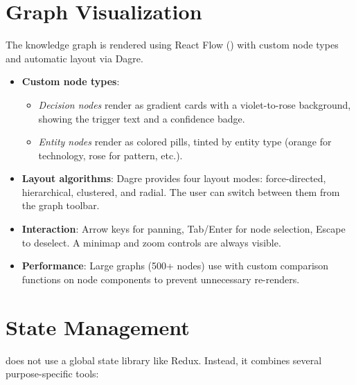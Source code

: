 \section{Graph Visualization}
\label{sec:graph-visualization}

The knowledge graph is rendered using React Flow ()
with custom node types and automatic layout via Dagre.

\begin{itemize}
    \item \textbf{Custom node types}:
          \begin{itemize}
              \item \emph{Decision nodes} render as gradient cards with a
                    violet-to-rose background, showing the trigger text and
                    a confidence badge.
              \item \emph{Entity nodes} render as colored pills, tinted
                    by entity type (orange for technology, rose for pattern,
                    etc.).
          \end{itemize}

    \item \textbf{Layout algorithms}: Dagre provides four layout modes:
          force-directed, hierarchical, clustered, and radial.  The user
          can switch between them from the graph toolbar.

    \item \textbf{Interaction}: Arrow keys for panning, Tab/Enter for
          node selection, Escape to deselect.  A minimap and zoom
          controls are always visible.

    \item \textbf{Performance}: Large graphs (500+ nodes) use
           with custom comparison functions on node
          components to prevent unnecessary re-renders.
\end{itemize}


\section{State Management}
\label{sec:state-management}

\sysname{} does not use a global state library like Redux.  Instead,
it combines several purpose-specific tools:


